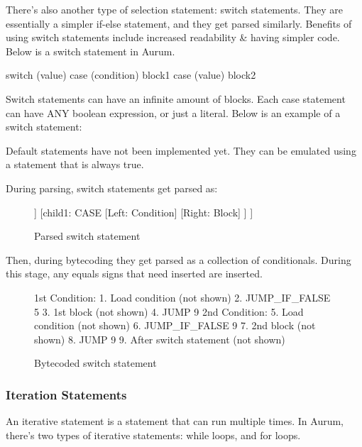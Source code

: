 \documentclass[12pt, letterpaper, oneside]{article}
\begin{document}
	
	There's also another type of selection statement: switch statements. They are essentially a simpler if-else statement, and they get parsed similarly. Benefits of using switch statements include increased readability \& having simpler code. Below is a switch statement in Aurum.
	\begin{spverbatim}
		switch (value) {
			case (condition) {
				block1
			}
			case (value) {
				block2
			}
		}
	\end{spverbatim}
	\newline
	Switch statements can have an infinite amount of blocks. Each case statement can have ANY boolean expression, or just a literal. Below is an example of a switch statement:
	Default statements have not been implemented yet. They can be emulated using a statement that is always true.
	
	
	During parsing, switch statements get parsed as:
	\begin{figure}[h]
		\begin{forest}
			[SWITCH
			[left: value]
			[child0: CASE
			[Left: Condition]
			[Right: Block]
			]
			[child1: CASE
			[Left: Condition]
			[Right: Block]
			]
			]
		\end{forest}
		\caption{Parsed switch statement}	
	\end{figure}
	Then, during bytecoding they get parsed as a collection of conditionals. During this stage, any equals signs that need inserted are inserted.
	\begin{figure}[h]
		\begin{spverbatim}
			1st Condition:
			1. Load condition (not shown)
			2. JUMP_IF_FALSE 5
			3. 1st block (not shown)
			4. JUMP 9
			2nd Condition:
			5. Load condition (not shown)
			6. JUMP_IF_FALSE 9
			7. 2nd block (not shown)
			8. JUMP 9
			9. After switch statement (not shown)
		\end{spverbatim}
		\caption{Bytecoded switch statement}	
	\end{figure} 
	\subsubsection{Iteration Statements}
	An iterative statement is a statement that can run multiple times. In Aurum, there's two types of iterative statements: while loops, and for loops.
	
\end{document}
